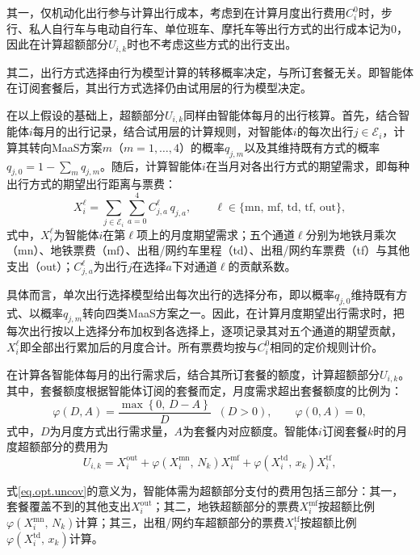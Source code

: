 其一，仅机动化出行参与计算出行成本，考虑到在计算月度出行费用$C_{i}^{0}$时，步行、私人自行车与电动自行车、单位班车、摩托车等出行方式的出行成本记为0，因此在计算超额部分$U_{i,k}$时也不考虑这些方式的出行支出。

其二，出行方式选择由行为模型计算的转移概率决定，与所订套餐无关。即智能体在订阅套餐后，其出行方式选择仍由试用层的行为模型决定。

在以上假设的基础上，超额部分$U_{i,k}$同样由智能体每月的出行核算。首先，结合智能体$i$每月的出行记录，结合试用层的计算规则，对智能体$i$的每次出行$j\in\mathcal{E}_{i}$，计算其转向MaaS方案$m$（$m=1,\dots,4$）的概率$q_{j,m}$以及其维持既有方式的概率$q_{j,0}=1-\sum_{m}q_{j,m}$。随后，计算智能体$i$在当月对各出行方式的期望需求，即每种出行方式的期望出行距离与票费：
\begin{equation}
X_{i}^{\ell}=\sum_{j\in\mathcal{E}_{i}}\sum_{a=0}^{4}C_{j,a}^{\ell}\,q_{j,a},\qquad
\ell\in\{\mathrm{mn},\,\mathrm{mf},\,\mathrm{td},\,\mathrm{tf},\,\mathrm{out}\},
\label{eq.opt.ledger}
\end{equation}
式中，$X_{i}^{\ell}$为智能体$i$在第$\ell$项上的月度期望需求；五个通道$\ell$分别为地铁月乘次（mn）、地铁票费（mf）、出租/网约车里程（td）、出租/网约车票费（tf）与其他支出（out）；$C_{j,a}^{\ell}$为出行$j$在选择$a$下对通道$\ell$的贡献系数。

具体而言，单次出行选择模型给出每次出行的选择分布，即以概率$q_{j,0}$维持既有方式、以概率$q_{j,m}$转向四类MaaS方案之一。因此，在计算月度期望出行需求时，把每次出行按以上选择分布加权到各选择上，逐项记录其对五个通道的期望贡献，$X_{i}^{\ell}$即全部出行累加后的月度合计。所有票费均按与$C_{i}^{0}$相同的定价规则计价。

在计算各智能体每月的出行需求后，结合其所订套餐的额度，计算超额部分$U_{i,k}$。其中，套餐额度根据智能体订阅的套餐而定，月度需求超出套餐额度的比例为：
\begin{equation}
\varphi\left(D,A\right)=\frac{\max\left\{0,\,D-A\right\}}{D}\;\;\left(D>0\right),\qquad \varphi\left(0,A\right)=0,
\label{eq.opt.writeoff}
\end{equation}
式中，$D$为月度方式出行需求量，$A$为套餐内对应额度。智能体$i$订阅套餐$k$时的月度超额部分的费用为
\begin{equation}
U_{i,k}=X_{i}^{\mathrm{out}}+\varphi\left(X_{i}^{\mathrm{mn}},\,N_{k}\right)X_{i}^{\mathrm{mf}}+\varphi\left(X_{i}^{\mathrm{td}},\,x_{k}\right)X_{i}^{\mathrm{tf}},
\label{eq.opt.uncov}
\end{equation}

式\eqref{eq.opt.uncov}的意义为，智能体需为超额部分支付的费用包括三部分：其一，套餐覆盖不到的其他支出$X_{i}^{\mathrm{out}}$；其二，地铁超额部分的票费$X_{i}^{\mathrm{mf}}$按超额比例$\varphi\left(X_{i}^{\mathrm{mn}},\,N_{k}\right)$计算；其三，出租/网约车超额部分的票费$X_{i}^{\mathrm{tf}}$按超额比例$\varphi\left(X_{i}^{\mathrm{td}},\,x_{k}\right)$计算。


